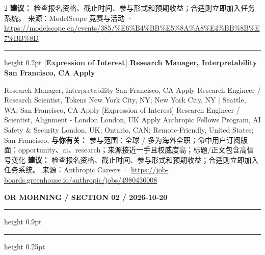 \documentclass[10.5pt]{ctexart}
\begin{document}
\begin{multicols}{2}
\textbf{建议：} 检查报名资格、截止时间、参与形式和预期收益；合适则立即加入任务系统。
{\footnotesize\color{ormuted} 来源：ModelScope 竞赛与活动 · \url{https://modelscope.cn/events/385/%E6%B4%BB%E5%8A%A8%E4%BB%8B%E7%BB%8D}}
\vspace{2mm}
\hrule height 0.2pt
\vspace{2mm}
{\large\bfseries [Expression of Interest] Research Manager, Interpretability San Francisco, CA Apply}\par
[Expression of Interest] Research Manager, Interpretability San Francisco, CA Apply Research Engineer / Research Scientist, Tokens New York City, NY; New York City, NY | Seattle, WA; San Francisco, CA Apply [Expression of Interest] Research Engineer / Scientist, Alignment - London London, UK Apply Anthropic Fellows Program, AI Safety \& Security London, UK; Ontario, CAN; Remote-Friendly, United States; San Francisco, 
\textbf{与你有关：} 参与范围：全球 / 多为海外全职；命中用户订阅版面：opportunity、ai、research；来源接近一手且权威度高；标题/正文包含高信号变化
\textbf{建议：} 检查报名资格、截止时间、参与形式和预期收益；合适则立即加入任务系统。
{\footnotesize\color{ormuted} 来源：Anthropic Careers · \url{https://job-boards.greenhouse.io/anthropic/jobs/4980436008}}
\end{multicols}
\newpage
{\small\bfseries OR MORNING / SECTION 02 / 2026-10-20}
\vspace{2mm}
\hrule height 0.9pt
\vspace{1.5mm}
\hrule height 0.25pt
\vspace{4mm}
\end{document}
